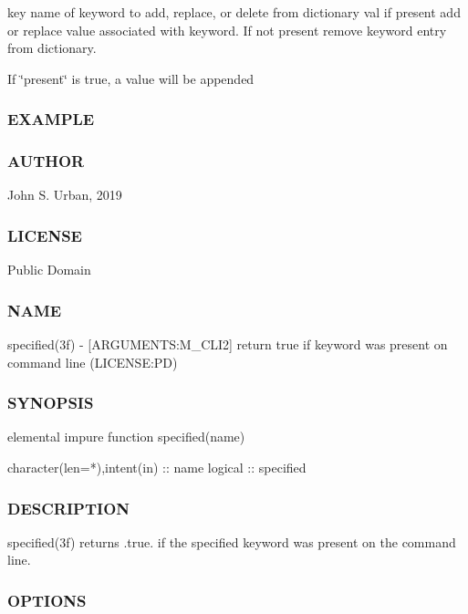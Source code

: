key name of keyword to add, replace, or delete from dictionary val if present add or replace value associated with keyword. If not present remove keyword entry from dictionary.

If \char`\"{}present\char`\"{} is true, a value will be appended \subsubsection*{E\+X\+A\+M\+P\+LE}

\subsubsection*{A\+U\+T\+H\+OR}

John S. Urban, 2019 \subsubsection*{L\+I\+C\+E\+N\+SE}

Public Domain \subsubsection*{N\+A\+ME}

specified(3f) -\/ \mbox{[}A\+R\+G\+U\+M\+E\+N\+TS\+:M\+\_\+\+C\+L\+I2\mbox{]} return true if keyword was present on command line (L\+I\+C\+E\+N\+SE\+:PD)

\subsubsection*{S\+Y\+N\+O\+P\+S\+IS}

\begin{DoxyVerb}elemental impure function specified(name)

 character(len=*),intent(in) :: name
 logical :: specified
\end{DoxyVerb}


\subsubsection*{D\+E\+S\+C\+R\+I\+P\+T\+I\+ON}

\begin{DoxyVerb}specified(3f) returns .true. if the specified keyword was present on
the command line.
\end{DoxyVerb}


\subsubsection*{O\+P\+T\+I\+O\+NS}

